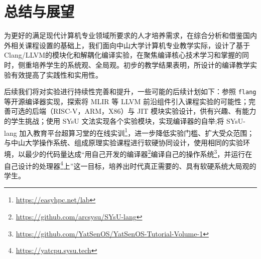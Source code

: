 \documentclass{SCIS2020cn}
\begin{document}
\section{总结与展望}
为更好的满足现代计算机专业领域所要求的人才培养需求，在综合分析和借鉴国内外相关课程设置的基础上，我们面向中山大学计算机专业教学实际，设计了基于Clang/LLVM的模块化和解耦化编译实验，在聚焦编译核心技术学习和掌握的同时，侧重培养学生的系统观、全局观。初步的教学结果表明，所设计的编译教学实验有效提高了实践性和实用性。

后续我们将对实验进行持续性完善和提升，一些可能的后续计划如下：参照 \texttt{flang} 等开源编译器实现，探索将 MLIR 等 LLVM 前沿组件引入课程实验的可能性；完善可选的后端（RISC-V，ARM，X86）与 JIT 模块实验设计，供有兴趣、有能力的学生挑战；使用 SYsU 文法实现各个实验模块，实现编译器的自举;将 SYsU-lang 加入教育平台超算习堂的在线实训\footnote{\url{https://easyhpc.net/lab}}，进一步降低实验门槛、扩大受众范围；与中山大学操作系统、组成原理实验课程进行软硬协同设计，使用相同的实验环境，以最少的代码量达成“用自己开发的编译器\footnote{\url{https://github.com/arcsysu/SYsU-lang}}编译自己的操作系统\footnote{\url{https://github.com/YatSenOS/YatSenOS-Tutorial-Volume-1}}，并运行在自己设计的处理器\footnote{\url{https://yatcpu.sysu.tech}}上”这一目标，培养出时代真正需要的、具有软硬系统大局观的学生。


\end{document}
